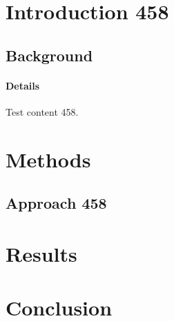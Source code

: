 \documentclass{article}
\begin{document}
\section{Introduction 458}
\subsection{Background}
\paragraph{Details} Test content 458.
\section{Methods}
\subsection{Approach 458}
\section{Results}
\section{Conclusion}
\end{document}
